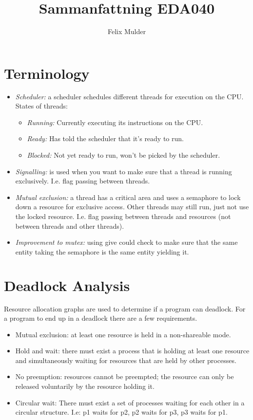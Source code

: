 \documentclass[a4paper]{article}
\title{Sammanfattning EDA040}
\author{Felix Mulder}
\begin{document}
\maketitle
\thispagestyle{empty}
\newpage
\setcounter{page}{1}

\section{Terminology}
\begin{itemize}
  \item \emph{Scheduler:} a scheduler schedules different threads for execution
        on the CPU. States of threads:
        \begin{itemize}
          \item \emph{Running:} Currently executing its instructions on the CPU.
          \item \emph{Ready:} Has told the scheduler that it's ready to run.
          \item \emph{Blocked:} Not yet ready to run, won't be picked by the
                scheduler.
        \end{itemize}
  \item \emph{Signalling:} is used when you want to make sure that a thread is
        running exclusively. I.e. flag passing between threads.
  \item \emph{Mutual exclusion:} a thread has a critical area and uses a semaphore
        to lock down a resource for exclusive access. Other threads may still
        run, just not use the locked resource. I.e. flag passing between threads
        and resources (not between threads and other threads).
  \item \emph{Improvement to mutex:} using give could check to make sure that the
        same entity taking the semaphore is the same entity yielding it.
\end{itemize}

\section{Deadlock Analysis}
Resource allocation graphs are used to determine if a program can deadlock.
For a program to end up in a deadlock there are a few requirements.
\begin{itemize}
  \item Mutual exclusion: at least one resource is held in a non-shareable mode.
  \item Hold and wait: there must exist a process that is holding at least one
        resource and simultaneously waiting for resources that are held by other
        processes.
  \item No preemption: resources cannot be preempted; the resource can only be 
        released voluntarily by the resource holding it.
  \item Circular wait: There must exist a set of processes waiting for each other
        in a circular structure. I.e: p1 waits for p2, p2 waits for p3, p3 waits
        for p1.
\end{itemize}
\end{document}

